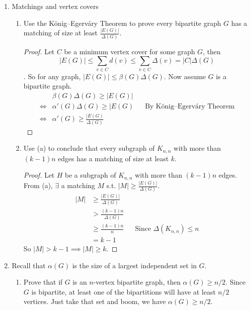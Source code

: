 \documentclass[12pt]{article}
\begin{document}
\begin{enumerate}
\medskip


\item Matchings and vertex covers
\begin{enumerate}
\item Use the K\"onig--Egerv\'ary Theorem to prove every bipartite graph $G$ has a matching of size at least $\frac{|E(G)|}{\Delta(G)}$.
\begin{proof}
	Let $C$ be a minimum vertex cover for some graph $G$, then $$|E(G)|\leq\sum_{v\in C}d(v) \leq \sum_{v\in C}\Delta(v) = |C|\Delta(G)$$. So for any graph, $|E(G)|\leq \beta(G)\Delta(G)$. Now assume $G$ is a bipartite graph.
	\[\begin{aligned}
	&\beta(G)\Delta(G) \geq |E(G)|\\
	\iff &\alpha'(G)\Delta(G)\geq|E(G) && \text{By K\"onig--Egerv\'ary Theorem}\\
	\iff &\alpha'(G) \geq \frac{|E(G)}{\Delta(G)}
	\end{aligned}\]
\end{proof}
\item Use (a) to conclude that every subgraph of $K_{n,n}$ with more than $(k-1)n$ edges has a matching of size at least $k$.
\begin{proof}
	Let $H$ be a subgraph of $K_{n,n}$ with more than $(k-1)n$ edges. From (a), $\exists$ a matching $M$ s.t. $|M| \geq \frac{|E(G)|}{\Delta(G)}$.
	\begin{align*}
		|M| &\geq \frac{|E(G)|}{\Delta(G)}\\
		&> \frac{(k-1)n}{\Delta(G)}\\
		&\geq \frac{(k-1)n}{n} &&\text{Since } \Delta(K_{n,n})\leq n\\
		&= k-1
	\end{align*}
	So $|M|>k-1 \implies |M|\geq k$.
\end{proof}
\end{enumerate}

\medskip 
\item Recall that $\alpha(G)$ is the size of a largest independent set in $G$. 
\begin{enumerate}
\item Prove that if $G$ is an $n$-vertex bipartite graph, then $\alpha(G) \geq n/2$.\m
Since $G$ is bipartite, at least one of the bipartitions will have at least $n/2$ vertices. Just take that set and boom, we have $\alpha(G) \geq n/2$.


\end{enumerate}
\end{enumerate}
\end{document}

